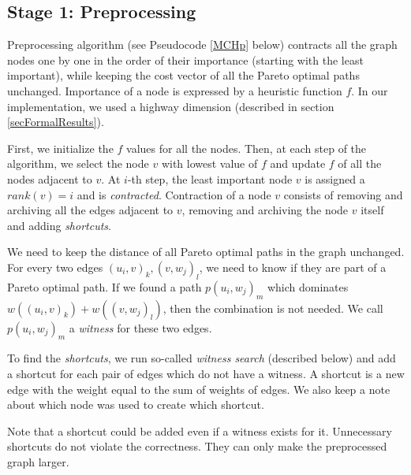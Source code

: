 

\subsection{Stage 1: Preprocessing}
\label{subsecStage1}

Preprocessing algorithm (see Pseudocode \ref{MCHp} below) contracts all the graph nodes one by one in the order of their importance (starting with the least important), while keeping the cost vector of all the Pareto optimal paths unchanged. Importance of a node is expressed by a heuristic function $f$. In our implementation, we used a highway dimension (described in section \ref{secFormalResults}).
 
First, we initialize the $f$ values for all the nodes. Then, at each step of the algorithm, we select the node $v$ with lowest value of $f$ and update $f$ of all the nodes adjacent to $v$. 
At $i$-th step, the least important node $v$ is assigned a $rank(v) = i$ and is \emph{contracted}. 
Contraction of a node $v$ consists of removing and archiving all the edges adjacent to $v$, removing and archiving the node $v$ itself and adding {\em shortcuts}. 

We need to keep the distance of all Pareto optimal paths in the graph unchanged. For every two edges $(u_i,v)_k,(v,w_j)_l$, we need to know if they are part of a Pareto optimal path. If we found a path $p(u_i,w_j)_m$ which dominates $w((u_i,v)_k)+w((v,w_j)_l)$, then the combination is not needed. We call $p(u_i,w_j)_m$ a \emph{witness} for these two edges. 

To find the {\em shortcuts}, we run so-called {\em witness search} (described below) and add a shortcut for each pair of edges which do not have a witness. A shortcut is a new edge with the weight equal to the sum of weights of edges. We also keep a note about which node was used to create which shortcut.

Note that a shortcut could be added even if a witness exists for it. Unnecessary shortcuts do not violate the correctness. They can only make the preprocessed graph larger.


